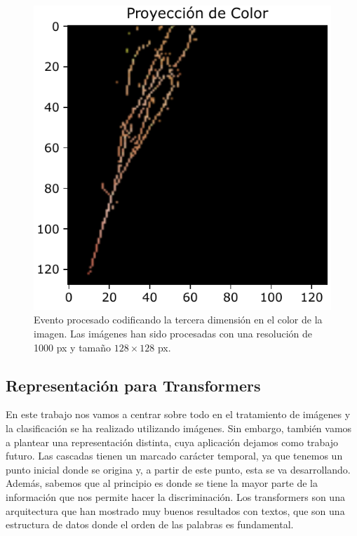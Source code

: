 \documentclass[a4paper,12pt,oneside,titlepage]{book}
\begin{document}
\begin{figure}[h!]
  \centering
  \includegraphics[scale=0.85]{proyeccion_color.pdf}
  \caption{Evento procesado codificando la tercera dimensión en el color de la imagen. Las imágenes han sido procesadas con una resolución de 1000 px y tamaño $128\times128$ px.}
  \label{fig:proy_color}
\end{figure}

\subsection*{Representación para Transformers}

En este trabajo nos vamos a centrar sobre todo en el tratamiento de imágenes y la clasificación se ha realizado utilizando imágenes. Sin embargo, también vamos a plantear una representación distinta, cuya aplicación dejamos como trabajo futuro. Las cascadas tienen un marcado carácter temporal, ya que tenemos un punto inicial donde se origina y, a partir de este punto, esta se va desarrollando. Además, sabemos que al principio es donde se tiene la mayor parte de la información que nos permite hacer la discriminación. Los transformers son una arquitectura que han mostrado muy buenos resultados con textos, que son una estructura de datos donde el orden de las palabras es fundamental.
\end{document}
